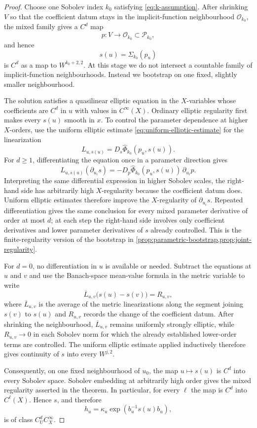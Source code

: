 \documentclass[11pt,reqno]{amsart}
\theoremstyle{definition}
\theoremstyle{remark}
\newcommand{\cO}{\mathcal O}
\newcommand{\cP}{\mathcal P}
\begin{document}
\begin{proof}
Choose one Sobolev index $k_0$ satisfying \eqref{eq:k-assumption}.  After shrinking $V$ so that the coefficient datum stays in the implicit-function neighbourhood $\cO_{k_0}$, the mixed family gives a $C^d$ map
\[
  p:V\longrightarrow\cO_{k_0}\subset\cP_{k_0},
\]
and hence
\[
  s(u)=\Sigma_{k_0}(p_u)
\]
is $C^d$ as a map to $W^{k_0+2,2}$.  At this stage we do not intersect a countable family of implicit-function neighbourhoods.  Instead we bootstrap on one fixed, slightly smaller neighbourhood.

The solution satisfies a quasilinear elliptic equation in the $X$-variables whose coefficients are $C^d$ in $u$ with values in $C^\infty(X)$.  Ordinary elliptic regularity first makes every $s(u)$ smooth in $x$.  To control the parameter dependence at higher $X$-orders, use the uniform elliptic estimate \eqref{eq:uniform-elliptic-estimate} for the linearization
\[
  L_{u,s(u)}=D_s\widehat\Phi_{k_0}(p_u,s(u)).
\]
For $d\ge1$, differentiating the equation once in a parameter direction gives
\[
  L_{u,s(u)}(\partial_{u_i}s)
  =-D_p\widehat\Phi_{k_0}(p_u,s(u))\,\partial_{u_i}p.
\]
Interpreting the same differential expression in higher Sobolev scales, the right-hand side has arbitrarily high $X$-regularity because the coefficient datum does.  Uniform elliptic estimates therefore improve the $X$-regularity of $\partial_{u_i}s$.  Repeated differentiation gives the same conclusion for every mixed parameter derivative of order at most $d$; at each step the right-hand side involves only coefficient derivatives and lower parameter derivatives of $s$ already controlled.  This is the finite-regularity version of the bootstrap in \cref{prop:parametric-bootstrap,prop:joint-regularity}.

For $d=0$, no differentiation in $u$ is available or needed.  Subtract the equations at $u$ and $v$ and use the Banach-space mean-value formula in the metric variable to write
\[
  \overline L_{u,v}\bigl(s(u)-s(v)\bigr)=R_{u,v},
\]
where $\overline L_{u,v}$ is the average of the metric linearizations along the segment joining $s(v)$ to $s(u)$ and $R_{u,v}$ records the change of the coefficient datum.  After shrinking the neighbourhood, $\overline L_{u,v}$ remains uniformly strongly elliptic, while $R_{u,v}\to0$ in each Sobolev norm for which the already established lower-order terms are controlled.  The uniform elliptic estimate applied inductively therefore gives continuity of $s$ into every $W^{j,2}$.

Consequently, on one fixed neighbourhood of $u_0$, the map $u\mapsto s(u)$ is $C^d$ into every Sobolev space.  Sobolev embedding at arbitrarily high order gives the mixed regularity asserted in the theorem.  In particular, for every $\ell$ the map is $C^d$ into $C^\ell(X)$.  Hence $s$, and therefore
\[
  h_u=\kappa_u\exp(b_u^{-1}s(u)b_u),
\]
is of class $C^d_UC^\infty_X$.


\end{proof}
\end{document}
